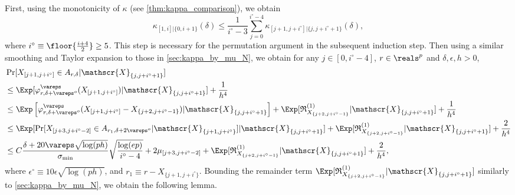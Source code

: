 \documentclass[aos]{imsart}
\begin{document}
\begin{appendix}
First, using the monotonicity of $\kappa$ (see \cref{thm:kappa_comparison}), we obtain
\begin{equation*}
    \kappa_{[1, i]|\{0, i+1\}}(\delta) 
    \leq \frac{1}{i^\circ-3} \sum_{j=0}^{i^\circ-4} \kappa_{[j+1, j+i^\circ]|\{j, j+i^\circ+1\}}(\delta),
\end{equation*}
where $i^\circ \equiv \floor{\frac{i+4}{2}} \geq 5$.
This step is necessary for the permutation argument in the subsequent induction step. Then using a similar smoothing and Taylor expansion to those in \cref{sec:kappa_by_mu_N}, we obtain for any $j \in [0, i^\circ-4]$, $r \in \reals^p$ and $\delta, \epsilon, h > 0$, 
\begin{equation} \label{eq:anti_concentration_Taylor_P}
\begin{aligned}
    & \Pr[X_{[j+1, j+i^\circ]} \in A_{r,\delta} | \mathscr{X}_{\{j, j+i^\circ+1\}}] \\
    & \leq \Exp[\varphi_{r,\delta+\vareps^o}^\vareps(X_{[j+1, j+i^\circ]}) 
    | \mathscr{X}_{\{j, j+i^\circ+1\}}] 
    + \frac{1}{h^4} \\
    & \leq \Exp\left[ 
        \varphi_{r,\delta+\vareps^o}^\vareps(X_{[j+1, j+i^\circ]} - X_{\{j+2,j+i^\circ-1\}}) | \mathscr{X}_{\{j, j+i^\circ+1\}} 
    \right]
    + \Exp[ \mathfrak{R}_{X_{\{j+2, j+i^\circ-1\}}}^{(1)} | \mathscr{X}_{\{j, j+i^\circ+1\}} ]
    + \frac{1}{h^4} \\
    & \leq \Exp[\Pr[
        X_{[j+3,j+i^\circ-2]} \in A_{r_1, \delta + 2\vareps^o} 
        | \mathscr{X}_{\{j+1, j+i^\circ\}}
    ] | \mathscr{X}_{\{j, j+i^\circ+1\}} ] 
    + \Exp[ \mathfrak{R}_{X_{\{j+2, j+i^\circ-1\}}}^{(1)} | \mathscr{X}_{\{j, j+i^\circ+1\}} ]
    + \frac{2}{h^4} \\
    & \leq C\frac{\delta + 20\vareps\sqrt{\log(ph)}}{\sigma_{\min}} \sqrt{\frac{\log(ep)}{i^\circ-4}}
    + 2\mu_{[j+3,j+i^\circ-2]} + \Exp[ \mathfrak{R}_{X_{\{j+2, j+i^\circ-1\}}}^{(1)} | \mathscr{X}_{\{j, j+i^\circ+1\}} ] + \frac{2}{h^4},
\end{aligned}
\end{equation}
where $\epsilon^\circ \equiv 10 \epsilon \sqrt{\log(ph)}$, and $r_1 \equiv r - X_{\{j+1, j+i^\circ\}}$. Bounding the remainder term $\Exp[ \mathfrak{R}_{X_{\{j+2, j+i^\circ-1\}}}^{(1)} | \mathscr{X}_{\{j, j+i^\circ+1\}} ]$ similarly to \cref{sec:kappa_by_mu_N}, we obtain the following lemma.


\end{appendix}
\end{document}
